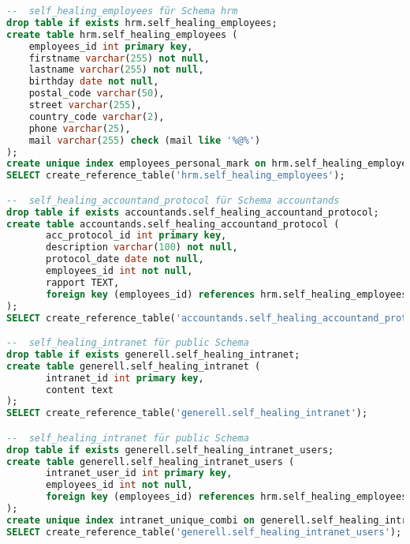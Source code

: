 \begin{lstlisting}[language=sql, caption=StackGres-Citus - Self Healing Tests - CREATE-SQL,captionpos=b,label={stackgres_citus-self-healing-create-sql},breaklines=true]
--  self_healing_employees für Schema hrm
drop table if exists hrm.self_healing_employees;
create table hrm.self_healing_employees (
    employees_id int primary key,
    firstname varchar(255) not null,
    lastname varchar(255) not null,
    birthday date not null,
    postal_code varchar(50),
    street varchar(255),
    country_code varchar(2),
    phone varchar(25),
    mail varchar(255) check (mail like '%@%')
);
create unique index employees_personal_mark on hrm.self_healing_employees(firstname, lastname, birthday);
SELECT create_reference_table('hrm.self_healing_employees');

--  self_healing_accountand_protocol für Schema accountands
drop table if exists accountands.self_healing_accountand_protocol;
create table accountands.self_healing_accountand_protocol (
       acc_protocol_id int primary key,
       description varchar(100) not null,
       protocol_date date not null,
       employees_id int not null,
       rapport TEXT,
       foreign key (employees_id) references hrm.self_healing_employees(employees_id) on update restrict on delete restrict
);
SELECT create_reference_table('accountands.self_healing_accountand_protocol');

--  self_healing_intranet für public Schema
drop table if exists generell.self_healing_intranet;
create table generell.self_healing_intranet (
       intranet_id int primary key,
       content text
);
SELECT create_reference_table('generell.self_healing_intranet');

--  self_healing_intranet für public Schema
drop table if exists generell.self_healing_intranet_users;
create table generell.self_healing_intranet_users (
       intranet_user_id int primary key,
       employees_id int not null,
       foreign key (employees_id) references hrm.self_healing_employees(employees_id) on update restrict on delete restrict
);
create unique index intranet_unique_combi on generell.self_healing_intranet_users(intranet_user_id, employees_id);
SELECT create_reference_table('generell.self_healing_intranet_users');
\end{lstlisting}


